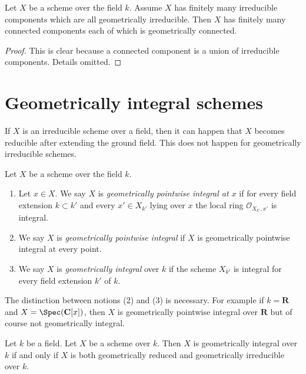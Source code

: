 \begin{lemma}
\label{lemma-irreducible-components-geometrically-irreducible}
Let $X$ be a scheme over the field $k$.
Assume $X$ has finitely many irreducible components which are
all geometrically irreducible.
Then $X$ has finitely many connected components each of which is
geometrically connected.
\end{lemma}

\begin{proof}
This is clear because a connected component is a union of irreducible
components. Details omitted.
\end{proof}







\section{Geometrically integral schemes}
\label{section-geometrically-integral}

\noindent
If $X$ is an irreducible scheme over a field, then it can happen that $X$
becomes reducible after extending the ground field. This does not happen
for geometrically irreducible schemes.

\begin{definition}
\label{definition-geometrically-integral}
Let $X$ be a scheme over the field $k$.
\begin{enumerate}
\item Let $x \in X$. We say $X$ is
{\it geometrically pointwise integral at $x$} if for every
field extension $k \subset k'$ and every $x' \in X_{k'}$ lying over $x$
the local ring $\mathcal{O}_{X_{k'}, x'}$ is integral.
\item We say $X$ is {\it geometrically pointwise integral} if $X$
is geometrically pointwise integral at every point.
\item We say $X$ is {\it geometrically integral} over $k$ if the scheme
$X_{k'}$ is integral for every field extension $k'$ of $k$.
\end{enumerate}
\end{definition}

\noindent
The distinction between notions (2) and (3) is necessary.
For example if $k = \mathbf{R}$ and $X = \Spec(\mathbf{C}[x])$,
then $X$ is geometrically pointwise integral over $\mathbf{R}$ but
of course not geometrically integral.

\begin{lemma}
\label{lemma-geometrically-integral}
Let $k$ be a field.
Let $X$ be a scheme over $k$.
Then $X$ is geometrically integral over $k$ if and only if
$X$ is both geometrically reduced and geometrically irreducible
over $k$.
\end{lemma}

